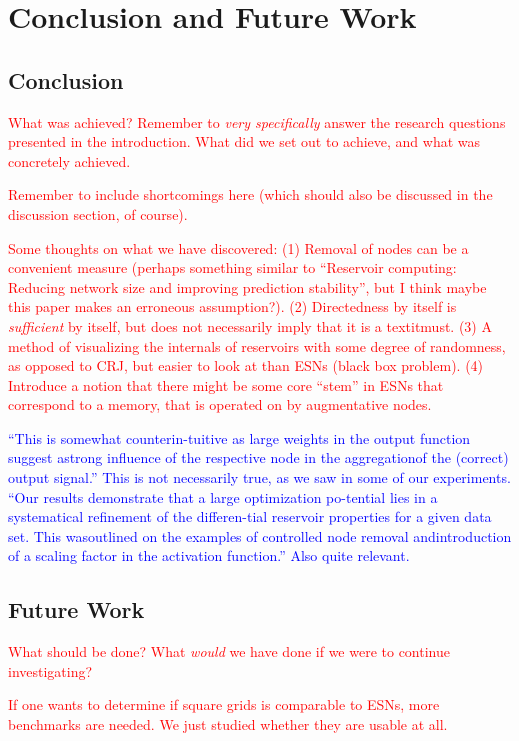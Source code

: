 \chapter{Conclusion and Future Work}

\section{Conclusion}

\textcolor{red}{
  What was achieved? Remember to \textit{very specifically} answer the research
questions presented in the introduction. What did we set out to achieve, and
what was concretely achieved.
}

\textcolor{red}{
  Remember to include shortcomings here (which should also be discussed in the
discussion section, of course).
}

\textcolor{red}{
  Some thoughts on what we have discovered: (1) Removal of nodes can be a
convenient measure (perhaps something similar to ``Reservoir computing: Reducing
network size and improving prediction stability'', but I think maybe this paper
makes an erroneous assumption?). (2) Directedness by itself is
\textit{sufficient} by itself, but does not necessarily imply that it is a
textit{must}. (3) A method of visualizing the internals of reservoirs with some
degree of randomness, as opposed to CRJ, but easier to look at than ESNs (black
box problem). (4) Introduce a notion that there might be some core ``stem'' in
ESNs that correspond to a memory, that is operated on by augmentative nodes.
}

\textcolor{blue}{
  ``This is somewhat counterin-tuitive as large weights in the output function
suggest astrong influence of the respective node in the aggregationof the
(correct) output signal.'' This is not necessarily true, as we saw in some of
our experiments. ``Our results demonstrate that a large optimization po-tential
lies in a systematical refinement of the differen-tial reservoir properties for
a given data set.  This wasoutlined on the examples of controlled node removal
andintroduction of a scaling factor in the activation function.'' Also quite
relevant.
}

\section{Future Work}

\textcolor{red}{
  What should be done? What \textit{would} we have done if we were to continue
investigating?
}

\textcolor{red}{
  If one wants to determine if square grids is comparable to ESNs, more
benchmarks are needed. We just studied whether they are usable at all.
}

